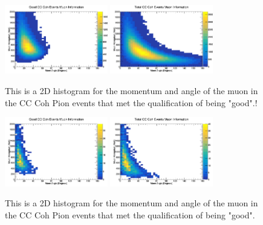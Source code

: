 \documentclass[11pt]{article}
\begin{document}
\begin{figure}[H]
\centering
\includegraphics[width=0.4\textwidth]{NewNMBergerSehgalImages/6-GoodCCCohMuonInfoNMBS.png}
\includegraphics[width=0.4\textwidth]{NewNMBergerSehgalImages/9-TotalCCCohMuonInfoNMBS.png}
\caption{This is a 2D histogram for the momentum and angle of the muon in the CC Coh Pion events that met the qualification of being "good".!}
\end{figure}

\begin{figure}[H]
\centering
\includegraphics[width=0.4\textwidth]{NewNMBergerSehgalImages/7.png}
\includegraphics[width=0.4\textwidth]{NewNMBergerSehgalImages/8.png}
\caption{This is a 2D histogram for the momentum and angle of the muon in the CC Coh Pion events that met the qualification of being "good".}
\end{figure}


\end{document}
